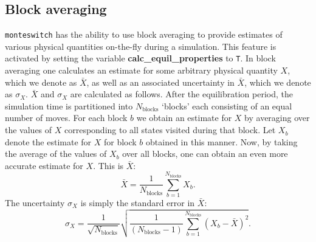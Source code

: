 \documentclass{report}
\begin{document}
\subsection{Block averaging}\label{sec:block_averaging}
\texttt{monteswitch} has the ability to use block averaging to provide estimates of various physical quantities on-the-fly during a simulation. 
This feature is activated by setting the variable \textbf{calc\_equil\_properties} to \texttt{T}.
In block averaging one calculates an estimate for some arbitrary physical quantity $X$, which we denote as $\bar{X}$, as well as an associated
uncertainty in $\bar{X}$, which we denote as $\sigma_X$. $\bar{X}$ and $\sigma_X$ are calculated as follows.
After the equilibration period, the simulation time is partitioned into $N_{\text{blocks}}$ `blocks' each consisting of an equal number of 
moves.
For each block $b$ we obtain an estimate for $X$ by averaging over the values of $X$ corresponding to all states visited during that block. 
Let $X_b$ denote the estimate for $X$ for block $b$ obtained in this manner. Now, by taking the average of the values of $X_b$ over all blocks, one can 
obtain an even more accurate estimate for $X$. This is $\bar{X}$: 
\begin{equation}
\bar{X}=\frac{1}{N_{\text{blocks}}}\sum_{b=1}^{N_{\text{blocks}}}X_b.
\end{equation}
The uncertainty $\sigma_X$ is simply the standard error in $\bar{X}$:
\begin{equation}
\sigma_X=\frac{1}{\sqrt{N_{\text{blocks}}}}\sqrt{\frac{1}{(N_{\text{blocks}}-1)}\sum_{b=1}^{N_{\text{blocks}}}(X_b-\bar{X})^2}.
\end{equation}
\end{document}

